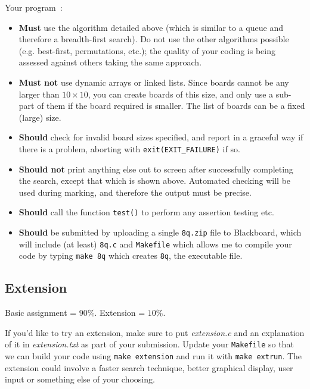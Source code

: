 \begin{exercise}
\noindent
Your program~:
\begin{itemize}
\item {\bf Must} use the algorithm detailed above (which is similar to a queue and therefore a breadth-first search). Do not use the other algorithms possible (e.g. best-first, permutations, etc.); the quality of your coding is being assessed against others taking the same approach.
\item {\bf Must not} use dynamic arrays or linked lists. Since boards cannot be any larger than $10 \times 10$, you can create boards of this size, and only use a sub-part of them if the board required is smaller. The list of boards can be a fixed (large) size.
\item {\bf Should} check for invalid board sizes specified, and report in a graceful way if there is a problem, aborting with \verb^exit(EXIT_FAILURE)^ if so.
\item {\bf Should not} print anything else out to screen after successfully
completing the search, except that which is shown above. Automated checking
will be used during marking, and therefore the output must be precise.
\item {\bf Should} call the function \verb^test()^ to perform any assertion testing etc.
\item {\bf Should} be submitted by uploading a single \verb^8q.zip^ file to Blackboard, which will include (at least) \verb^8q.c^ and \verb^Makefile^ which allows me to compile your code by typing \verb^make 8q^ which creates \verb^8q^, the executable file.
\end{itemize}

\subsection*{Extension}

Basic assignment = {\Large $90\%$}.
Extension = {\Large $10\%$}.

\noindent
If you'd like to try an extension, make sure to put {\it extension.c} and an explanation of it in {\it extension.txt}
as part of your submission. Update your \verb^Makefile^ so that we can build your code using \verb^make extension^ and run it with \verb^make extrun^.
\noindent The extension could
involve a faster search technique, better graphical display, user input
or something else of your choosing.

\end{exercise}
